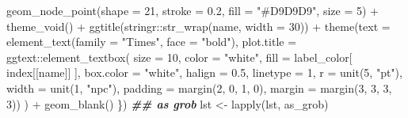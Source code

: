 \documentclass[
]{article}
\newenvironment{Shaded}{\begin{snugshade}}{\end{snugshade}}
\newcommand{\AttributeTok}[1]{\textcolor[rgb]{0.77,0.63,0.00}{#1}}
\newcommand{\DecValTok}[1]{\textcolor[rgb]{0.00,0.00,0.81}{#1}}
\newcommand{\DocumentationTok}[1]{\textcolor[rgb]{0.56,0.35,0.01}{\textbf{\textit{#1}}}}
\newcommand{\FloatTok}[1]{\textcolor[rgb]{0.00,0.00,0.81}{#1}}
\newcommand{\FunctionTok}[1]{\textcolor[rgb]{0.00,0.00,0.00}{#1}}
\newcommand{\NormalTok}[1]{#1}
\newcommand{\OtherTok}[1]{\textcolor[rgb]{0.56,0.35,0.01}{#1}}
\newcommand{\SpecialCharTok}[1]{\textcolor[rgb]{0.00,0.00,0.00}{#1}}
\newcommand{\StringTok}[1]{\textcolor[rgb]{0.31,0.60,0.02}{#1}}
\begin{document}
\begin{Shaded}
\begin{Highlighting}[]
      \FunctionTok{geom\_node\_point}\NormalTok{(}\AttributeTok{shape =} \DecValTok{21}\NormalTok{, }\AttributeTok{stroke =} \FloatTok{0.2}\NormalTok{, }\AttributeTok{fill =} \StringTok{"\#D9D9D9"}\NormalTok{, }\AttributeTok{size =} \DecValTok{5}\NormalTok{) }\SpecialCharTok{+}
      \FunctionTok{theme\_void}\NormalTok{() }\SpecialCharTok{+}
      \FunctionTok{ggtitle}\NormalTok{(stringr}\SpecialCharTok{::}\FunctionTok{str\_wrap}\NormalTok{(name, }\AttributeTok{width =} \DecValTok{30}\NormalTok{)) }\SpecialCharTok{+}
      \FunctionTok{theme}\NormalTok{(}\AttributeTok{text =} \FunctionTok{element\_text}\NormalTok{(}\AttributeTok{family =} \StringTok{"Times"}\NormalTok{, }\AttributeTok{face =} \StringTok{"bold"}\NormalTok{),}
        \AttributeTok{plot.title =}\NormalTok{ ggtext}\SpecialCharTok{::}\FunctionTok{element\_textbox}\NormalTok{(}
          \AttributeTok{size =} \DecValTok{10}\NormalTok{, }\AttributeTok{color =} \StringTok{"white"}\NormalTok{,}
          \AttributeTok{fill =}\NormalTok{ label\_color[ index[[name]] ],}
          \AttributeTok{box.color =} \StringTok{"white"}\NormalTok{,}
          \AttributeTok{halign =} \FloatTok{0.5}\NormalTok{, }\AttributeTok{linetype =} \DecValTok{1}\NormalTok{, }\AttributeTok{r =} \FunctionTok{unit}\NormalTok{(}\DecValTok{5}\NormalTok{, }\StringTok{"pt"}\NormalTok{), }\AttributeTok{width =} \FunctionTok{unit}\NormalTok{(}\DecValTok{1}\NormalTok{, }\StringTok{"npc"}\NormalTok{),}
          \AttributeTok{padding =} \FunctionTok{margin}\NormalTok{(}\DecValTok{2}\NormalTok{, }\DecValTok{0}\NormalTok{, }\DecValTok{1}\NormalTok{, }\DecValTok{0}\NormalTok{), }\AttributeTok{margin =} \FunctionTok{margin}\NormalTok{(}\DecValTok{3}\NormalTok{, }\DecValTok{3}\NormalTok{, }\DecValTok{3}\NormalTok{, }\DecValTok{3}\NormalTok{))}
\NormalTok{        ) }\SpecialCharTok{+}
      \FunctionTok{geom\_blank}\NormalTok{()}
\NormalTok{  \})}
\DocumentationTok{\#\# as grob}
\NormalTok{lst }\OtherTok{\textless{}{-}} \FunctionTok{lapply}\NormalTok{(lst, as\_grob)}


\end{Highlighting}
\end{Shaded}
\end{document}
